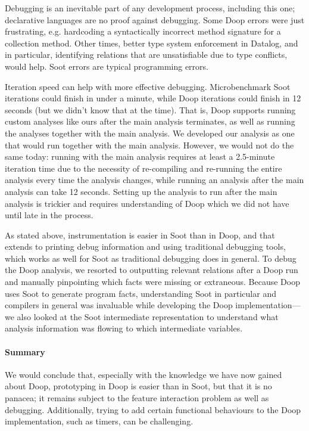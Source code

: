 Debugging is an inevitable part of any development process, including this one; declarative languages are no proof against debugging. Some Doop errors were just frustrating, e.g. hardcoding a syntactically incorrect method signature for a collection method. Other times, better type system enforcement in Datalog, and in particular, identifying relations that are unsatisfiable due to type conflicts, would help. Soot errors are typical programming errors.

Iteration speed can help with more effective debugging. Microbenchmark Soot iterations could finish in under a minute, while Doop iterations could finish in 12 seconds (but we didn't know that at the time). That is, Doop supports running custom analyses like ours after the main analysis terminates, as well as running the analyses together with the main analysis. We developed our analysis as one that would run together with the main analysis. However, we would not do the same today: running with the main analysis requires at least a 2.5-minute iteration time due to the necessity of re-compiling and re-running the entire analysis every time the analysis changes, while running an analysis after the main analysis can take 12 seconds. Setting up the analysis to run after the main analysis is trickier and requires understanding of Doop which we did not have until late in the process. 

As stated above, instrumentation is easier in Soot than in Doop, and that extends to printing debug information and using traditional debugging tools, which works as well for Soot as traditional debugging does in general. To debug the Doop analysis, we resorted to outputting relevant relations after a Doop run and manually pinpointing which facts were missing or extraneous. Because Doop uses Soot to generate program facts, understanding Soot in particular and compilers in general was invaluable while developing the Doop implementation---we also looked at the Soot intermediate representation to understand what analysis information was flowing to which intermediate variables.

\paragraph{Summary} We would conclude that, especially with the knowledge we have now gained about Doop, prototyping in Doop is easier than in Soot, but that it is no panacea; it remains subject to the feature interaction problem as well as debugging. Additionally, trying to add certain functional behaviours to the Doop implementation, such as timers, can be challenging.

